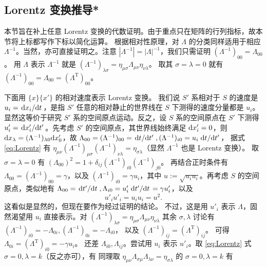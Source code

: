 \subsection{Lorentz 变换推导*}\label{sec:PoincareLorentz}

本节旨在补上任意 Lorentz 变换的代数证明。由于重点只在矩阵的行列指标，故本节将上标都写作下标以简化运算。
根据相对性原理，对 $\Lambda$ 的分类同样适用于相应 $\Lambda^{-1}$。当然，亦可直接证明之。注意 $|\Lambda^{-1}|=|\Lambda|^{-1}$，我们只需证明 $(\Lambda^{-1})_{00}=\Lambda_{00}$。
用 $\Lambda$ 表示 $\Lambda^{-1}$ 就是 $(\Lambda^{-1})_{\lambda\sigma}=\eta_{\mu\sigma}\Lambda_{\mu\nu}\eta_{\nu\lambda}$。
取其 $\sigma=\lambda=0$ 就有 $(\Lambda^{-1})_{00}=\Lambda_{00}=(\Lambda^\mathrm{T})_{00}$。

下面用 $\{x\}\{x'\}$ 的相对速度表示 Lorentz 变换。
我们说 $S'$ 系相对于 $S$ 的速度是 $u_i=\dv*{x_i}{t}$，是指 $S'$ 任意的相对静止的世界线在 $S$ 下测得的速度分量都是 $u_i$。显然这等价于研究 $S'$ 系的空间原点运动。反之，设 $S$ 系的空间原点在 $S'$ 下测得 $u'_i=\dv*{x'_i}{t'}$。先考虑 $S'$ 的空间原点，其世界线始终满足 $\dd x'_i=0$，则 $\dd x_\lambda=(\Lambda^{-1})_{\lambda 0}\dd x'_0$，故 $\Lambda_{00}=(\Lambda^{-1})_{00}=\dv*{t}{t'},(\Lambda^{-1})_{i0}=u_i\dv*{t}{t'}$，
据式 \eqref{eq:Lorentz} 有 $\eta_{\mu\nu}(\Lambda^{-1})_{\mu\sigma}(\Lambda^{-1})_{\nu\lambda}={\eta}_{\sigma\lambda}$（显然 $\Lambda^{-1}$ 也是 Lorentz 变换）。
取 $\sigma=\lambda=0$ 有 $(\Lambda_{00})^2=1+\delta_{ij}(\Lambda^{-1})_{i0}(\Lambda^{-1})_{j0}$。
再结合正时条件有 $\Lambda_{00}=(\Lambda^{-1})_{00}=\gamma$，以及 $(\Lambda^{-1})_{i0}=\gamma u_i$，其中 $u:=\sqrt{u_i u_i}$。再考虑 $S$ 的空间原点，类似地有 $\Lambda_{00}=\dv*{t'}{t},\Lambda_{i0}=u'_i \dv*{t'}{t}=\gamma u'_i$，以及
\[u'_iu'_i=u_i u_i=u^2.\]
这看似是显然的，但现在要作为经过证明的结论。
不过，这是用 $u'_i$ 表示 $\Lambda$，固然渴望用 $u_i$ 直接表示。对 $(\Lambda^{-1})_{\lambda\sigma}=\eta_{\mu\sigma}\Lambda_{\mu\nu}\eta_{\nu\lambda}$ 其余 $\sigma,\lambda$ 讨论有 $(\Lambda^{-1})_{i0}=-\Lambda_{0i},(\Lambda^{-1})_{0i} =-\Lambda_{i0}$，
以及 $(\Lambda^{-1})_{ij}=(\Lambda^\mathrm{T})_{ij}$。
可得 $\Lambda_{0i}=(\Lambda^\mathrm{T})_{i0}=-\gamma u_i$。
还差 $\Lambda_{i0},\Lambda_{ij}$。尝试用 $u_i$ 表示 $u'_i$。取 \eqref{eq:Lorentz} 式 $\sigma=0,\lambda=k$（反之亦可），有
同理取 $\eta_{\mu\nu}\Lambda_{\sigma\mu}\Lambda_{\lambda\nu}={\eta}_{\sigma\lambda}$ 的 $\sigma=0,\lambda=k$ 有
